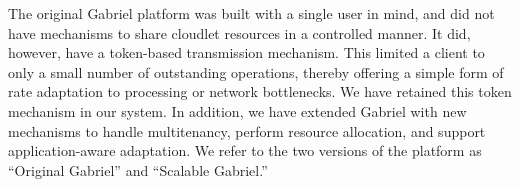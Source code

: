 
The original Gabriel platform was built with a single user in mind, and did not
have mechanisms to share cloudlet resources in a controlled manner.  It did,
however, have a token-based transmission mechanism.  This limited a client to
only a small number of outstanding operations, thereby offering a simple form of
rate adaptation to processing or network bottlenecks.  We have retained this
token mechanism in our system. In addition, we have extended Gabriel with new
mechanisms to handle multitenancy, perform resource allocation, and support
application-aware adaptation.  We refer to the two versions of the platform as
``Original Gabriel'' and ``Scalable Gabriel.''






